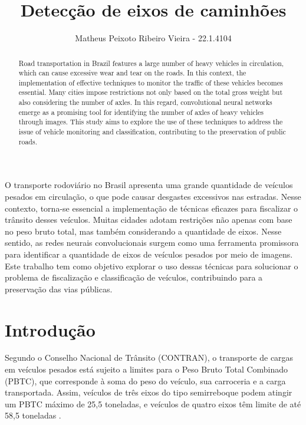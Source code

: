 \documentclass[12pt]{article}
\title{Detecção de eixos de caminhões}
\author{Matheus Peixoto Ribeiro Vieira - 22.1.4104}
\begin{document}
 

\maketitle

\begin{abstract}
    Road transportation in Brazil features a large number of heavy vehicles in circulation, which can cause excessive wear and tear on the roads. In this context, the implementation of effective techniques to monitor the traffic of these vehicles becomes essential. Many cities impose restrictions not only based on the total gross weight but also considering the number of axles. In this regard, convolutional neural networks emerge as a promising tool for identifying the number of axles of heavy vehicles through images. This study aims to explore the use of these techniques to address the issue of vehicle monitoring and classification, contributing to the preservation of public roads.
\end{abstract}
     
\begin{resumo} 
    O transporte rodoviário no Brasil apresenta uma grande quantidade de veículos pesados em circulação, o que pode causar desgastes excessivos nas estradas. Nesse contexto, torna-se essencial a implementação de técnicas eficazes para fiscalizar o trânsito desses veículos. Muitas cidades adotam restrições não apenas com base no peso bruto total, mas também considerando a quantidade de eixos. Nesse sentido, as redes neurais convolucionais surgem como uma ferramenta promissora para identificar a quantidade de eixos de veículos pesados por meio de imagens. Este trabalho tem como objetivo explorar o uso dessas técnicas para solucionar o problema de fiscalização e classificação de veículos, contribuindo para a preservação das vias públicas.
\end{resumo}


\section{Introdução}
    Segundo o Conselho Nacional de Trânsito (CONTRAN), o transporte de cargas em veículos pesados está sujeito a limites para o Peso Bruto Total Combinado (PBTC), que corresponde à soma do peso do veículo, sua carroceria e a carga transportada. Assim, veículos de três eixos do tipo semirreboque podem atingir um PBTC máximo de 25,5 toneladas, e veículos de quatro eixos têm limite de até 58,5 toneladas \cite{resolucao_contran}.
    
\end{document}
